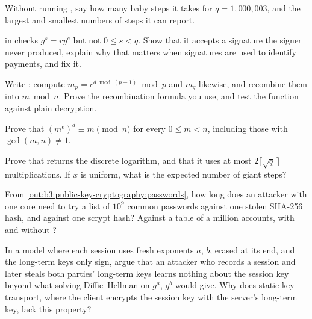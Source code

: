 \begin{exercise}[$\star$]\label{exo:b3:public-key-cryptography:4}
Without running , say how many baby steps it takes for $q = 1{,}000{,}003$, and the largest and smallest numbers of steps it can report.
\end{exercise}

\begin{exercise}[$\star\star$]\label{exo:b3:public-key-cryptography:5}
 in  checks $g^s = r y^e$ but not $0 \le s < q$. Show that it accepts a signature the signer never produced, explain why that matters when signatures are used to identify payments, and fix it.
\end{exercise}

\begin{exercise}[$\star\star$]\label{exo:b3:public-key-cryptography:6}
Write : compute $m_p = c^{d \bmod (p-1)} \bmod p$ and $m_q$ likewise, and recombine them into $m \bmod n$. Prove the recombination formula you use, and test the function against plain decryption.
\end{exercise}

\begin{exercise}[$\star\star$]\label{exo:b3:public-key-cryptography:7}
Prove that $(m^e)^d \equiv m \pmod n$ for every $0 \le m < n$, including those with $\gcd(m, n) \ne 1$.
\end{exercise}

\begin{exercise}[$\star\star$]\label{exo:b3:public-key-cryptography:8}
Prove that  returns the discrete logarithm, and that it uses at most $2\lceil \sqrt{q}\, \rceil$ multiplications. If $x$ is uniform, what is the expected number of giant steps?
\end{exercise}

\begin{exercise}[$\star\star$]\label{exo:b3:public-key-cryptography:9}
From \cref{out:b3:public-key-cryptography:passwords}, how long does an attacker with one core need to try a list of $10^9$ common passwords against one stolen SHA-256 hash, and against one scrypt hash? Against a table of a million accounts, with and without ?
\end{exercise}

\begin{exercise}[$\star\star\star$]\label{exo:b3:public-key-cryptography:10}
In a model where each session uses fresh exponents $a$, $b$, erased at its end, and the long-term keys only sign, argue that an attacker who records a session and later steals both parties' long-term keys learns nothing about the session key beyond what solving Diffie--Hellman on $g^a$, $g^b$ would give. Why does static  key transport, where the client encrypts the session key with the server's long-term  key, lack this property?
\end{exercise}

